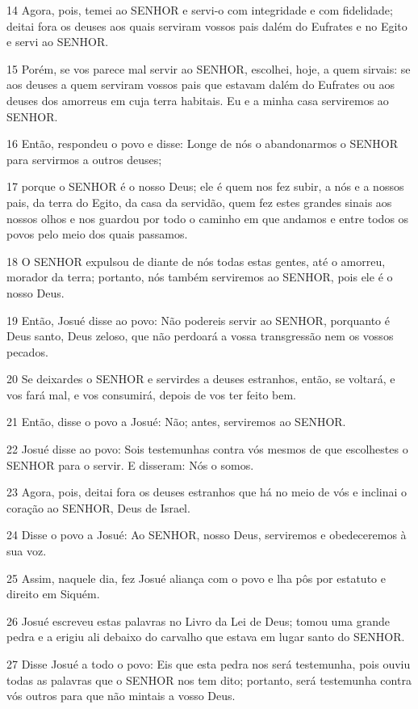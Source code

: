 \par 14 Agora, pois, temei ao SENHOR e servi-o com integridade e com fidelidade; deitai fora os deuses aos quais serviram vossos pais dalém do Eufrates e no Egito e servi ao SENHOR.
\par 15 Porém, se vos parece mal servir ao SENHOR, escolhei, hoje, a quem sirvais: se aos deuses a quem serviram vossos pais que estavam dalém do Eufrates ou aos deuses dos amorreus em cuja terra habitais. Eu e a minha casa serviremos ao SENHOR.
\par 16 Então, respondeu o povo e disse: Longe de nós o abandonarmos o SENHOR para servirmos a outros deuses;
\par 17 porque o SENHOR é o nosso Deus; ele é quem nos fez subir, a nós e a nossos pais, da terra do Egito, da casa da servidão, quem fez estes grandes sinais aos nossos olhos e nos guardou por todo o caminho em que andamos e entre todos os povos pelo meio dos quais passamos.
\par 18 O SENHOR expulsou de diante de nós todas estas gentes, até o amorreu, morador da terra; portanto, nós também serviremos ao SENHOR, pois ele é o nosso Deus.
\par 19 Então, Josué disse ao povo: Não podereis servir ao SENHOR, porquanto é Deus santo, Deus zeloso, que não perdoará a vossa transgressão nem os vossos pecados.
\par 20 Se deixardes o SENHOR e servirdes a deuses estranhos, então, se voltará, e vos fará mal, e vos consumirá, depois de vos ter feito bem.
\par 21 Então, disse o povo a Josué: Não; antes, serviremos ao SENHOR.
\par 22 Josué disse ao povo: Sois testemunhas contra vós mesmos de que escolhestes o SENHOR para o servir. E disseram: Nós o somos.
\par 23 Agora, pois, deitai fora os deuses estranhos que há no meio de vós e inclinai o coração ao SENHOR, Deus de Israel.
\par 24 Disse o povo a Josué: Ao SENHOR, nosso Deus, serviremos e obedeceremos à sua voz.
\par 25 Assim, naquele dia, fez Josué aliança com o povo e lha pôs por estatuto e direito em Siquém.
\par 26 Josué escreveu estas palavras no Livro da Lei de Deus; tomou uma grande pedra e a erigiu ali debaixo do carvalho que estava em lugar santo do SENHOR.
\par 27 Disse Josué a todo o povo: Eis que esta pedra nos será testemunha, pois ouviu todas as palavras que o SENHOR nos tem dito; portanto, será testemunha contra vós outros para que não mintais a vosso Deus.
